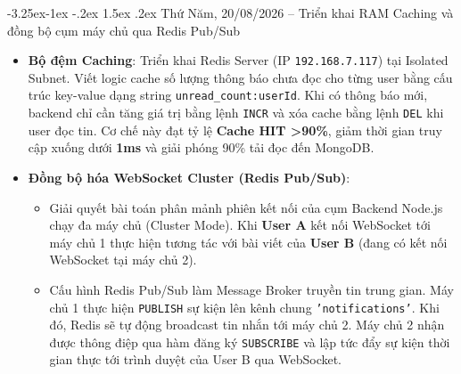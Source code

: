 \documentclass[12pt,a4paper]{article}
\makeatletter
\renewcommand\subsection{\@startsection{subsection}{2}{\z@}%
                                     {-3.25ex\@plus -1ex \@minus -.2ex}%
                                     {1.5ex \@plus .2ex}%
                                     {\normalfont\large\bfseries\color{cmcblue}}}
\makeatother
\begin{document}
\subsection{Thứ Năm, 20/08/2026 -- Triển khai RAM Caching và đồng bộ cụm máy chủ qua Redis Pub/Sub}
\begin{itemize}
    \item \textbf{Bộ đệm Caching}: Triển khai Redis Server (IP \texttt{192.168.7.117}) tại Isolated Subnet. Viết logic cache số lượng thông báo chưa đọc cho từng user bằng cấu trúc key-value dạng string \texttt{unread\_count:userId}. Khi có thông báo mới, backend chỉ cần tăng giá trị bằng lệnh \texttt{INCR} và xóa cache bằng lệnh \texttt{DEL} khi user đọc tin. Cơ chế này đạt tỷ lệ \textbf{Cache HIT >90\%}, giảm thời gian truy cập xuống dưới \textbf{1ms} và giải phóng 90\% tải đọc đến MongoDB.
    \item \textbf{Đồng bộ hóa WebSocket Cluster (Redis Pub/Sub)}:
    \begin{itemize}[nosep]
        \item Giải quyết bài toán phân mảnh phiên kết nối của cụm Backend Node.js chạy đa máy chủ (Cluster Mode). Khi \textbf{User A} kết nối WebSocket tới máy chủ 1 thực hiện tương tác với bài viết của \textbf{User B} (đang có kết nối WebSocket tại máy chủ 2).
        \item Cấu hình Redis Pub/Sub làm Message Broker truyền tin trung gian. Máy chủ 1 thực hiện \texttt{PUBLISH} sự kiện lên kênh chung \texttt{'notifications'}. Khi đó, Redis sẽ tự động broadcast tin nhắn tới máy chủ 2. Máy chủ 2 nhận được thông điệp qua hàm đăng ký \texttt{SUBSCRIBE} và lập tức đẩy sự kiện thời gian thực tới trình duyệt của User B qua WebSocket.
    \end{itemize}
\end{itemize}
\end{document}
